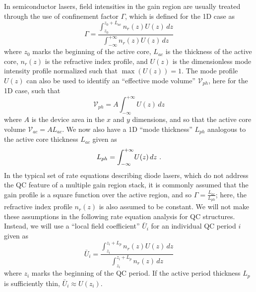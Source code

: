 \documentclass[12pt]{report}
\begin{document}
In semiconductor lasers, field intensities in the gain region are usually treated through the use of confinement factor $\Gamma$, which is defined for the 1D case as \cite{ColdrenCorzine}
\begin{equation}
\label{chpt1eqn:Gamma}
\Gamma = \frac{\int_{z_0}^{z_0+L_{ac}} \! n_r(z) U(z) \, dz}{\int_{-\infty}^{+\infty} \! n_r(z) U(z) \, dz}
\end{equation}
where $z_0$ marks the beginning of the active core, $L_{ac}$ is the thickness of the active core, $n_r(z)$ is the refractive index profile,
and $U(z)$ is the dimensionless mode intensity profile normalized such that $\max(U(z))=1$.  The mode profile $U(z)$ can also be used to identify an ``effective mode volume'' $\mathcal{V}_{ph}$, here for the 1D case, such that
\begin{equation}
\mathcal{V}_{ph} = A \int_{-\infty}^{+\infty} \! U(z) \, dz
\end{equation}
where $A$ is the device area in the $x$ and $y$ dimensions, and so that the active core volume $\mathcal{V}_{ac}=A L_{ac}$.  We now also have a 1D ``mode thickness'' $L_{ph}$ analogous to the active core thickness $L_{ac}$ given as
\begin{equation}
L_{ph} = \int_{-\infty}^{+\infty} \! U(z) \, dz \textnormal{~.}
\end{equation}
In the typical set of rate equations describing diode lasers, which do not address the QC feature of a multiple gain region stack, it is commonly assumed that the gain profile is a square function over the active region, and so $\Gamma=\frac{L_{ac}}{L_{ph}}$; here, the refractive index profile $n_r(z)$ is also assumed to be constant.  We will not make these assumptions in the following rate equation analysis for QC structures.  Instead, we will use a ``local field coefficient'' $\bar{U}_i$ for an individual QC period $i$ given as 
\begin{equation}
\bar{U}_i = \frac{\int_{z_i}^{z_i+L_{p}} \! n_r(z) U(z) \, dz}{\int_{z_i}^{z_i+L_p} \! n_r(z) \, dz}
\end{equation}
where $z_i$ marks the beginning of the QC period.  If the active period thickness $L_p$ is sufficiently thin, $\bar{U}_i\approx U(z_i)$.
\end{document}
